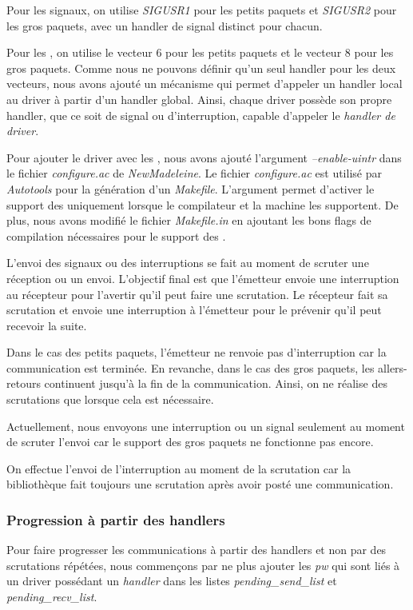 Pour les signaux, on utilise \emph{SIGUSR1} pour les petits paquets et \emph{SIGUSR2} pour les gros paquets,
avec un handler de signal distinct pour chacun.

Pour les \uintr{}, on utilise le vecteur 6 pour les petits paquets et le vecteur 8 pour les gros paquets.
Comme nous ne pouvons définir qu'un seul handler pour les deux vecteurs,
nous avons ajouté un mécanisme qui permet d'appeler un handler local au driver à partir d'un handler global.
Ainsi, chaque driver possède son propre handler, que ce soit de signal ou d'interruption, capable d'appeler le \emph{handler de driver}.

Pour ajouter le driver avec les \uintr{},
nous avons ajouté l'argument \emph{--enable-uintr} dans le fichier \emph{configure.ac} de \emph{NewMadeleine}.
Le fichier \emph{configure.ac} est utilisé par \emph{Autotools} pour la génération d'un \emph{Makefile}.
L'argument permet d'activer le support des \uintr{} uniquement lorsque le compilateur et la machine les supportent.
De plus, nous avons modifié le fichier \emph{Makefile.in} en ajoutant les bons flags de compilation nécessaires pour le support des \uintr{}.

L'envoi des signaux ou des interruptions se fait au moment de scruter une réception ou un envoi.
L'objectif final est que l'émetteur envoie une interruption au récepteur pour l'avertir qu'il peut faire une scrutation.
Le récepteur fait sa scrutation et envoie une interruption à l'émetteur pour le prévenir qu'il peut recevoir la suite.

Dans le cas des petits paquets, l'émetteur ne renvoie pas d'interruption car la communication est terminée.
En revanche, dans le cas des gros paquets, les allers-retours continuent jusqu'à la fin de la communication.
Ainsi, on ne réalise des scrutations que lorsque cela est nécessaire.

Actuellement, nous envoyons une interruption ou un signal seulement au moment de scruter l'envoi car le support des gros paquets ne fonctionne pas encore.

On effectue l'envoi de l'interruption au moment de la scrutation car la bibliothèque fait toujours une scrutation après avoir posté une communication.

\subsubsection{Progression à partir des handlers}
\label{progression}

Pour faire progresser les communications à partir des handlers et non par des scrutations répétées,
nous commençons par ne plus ajouter les \emph{pw} qui sont liés à un driver possédant un \emph{handler} dans les listes \emph{pending_send_list} et \emph{pending_recv_list}.

